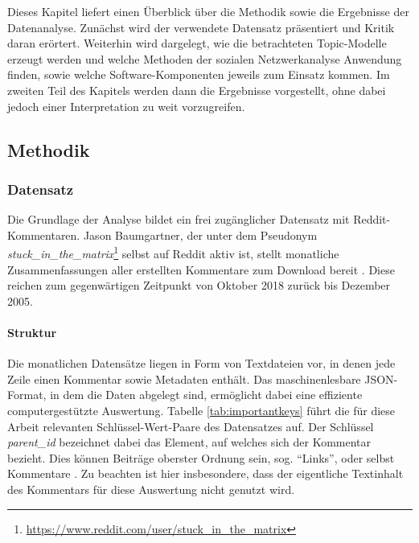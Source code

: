 \documentclass[11pt,a4paper,twoside]{article}
\let\rmarkdownfootnote\footnote%
\def\footnote{\protect\rmarkdownfootnote}
\let\oldpar\paragraph
\renewcommand{\paragraph}{\oldpar*}
\begin{document}
Dieses Kapitel liefert einen Überblick über die Methodik sowie die
Ergebnisse der Datenanalyse. Zunächst wird der verwendete Datensatz
präsentiert und Kritik daran erörtert. Weiterhin wird dargelegt, wie die
betrachteten Topic-Modelle erzeugt werden und welche Methoden der
sozialen Netzwerkanalyse Anwendung finden, sowie welche
Software-Komponenten jeweils zum Einsatz kommen. Im zweiten Teil des
Kapitels werden dann die Ergebnisse vorgestellt, ohne dabei jedoch einer
Interpretation zu weit vorzugreifen.

\hypertarget{methodik}{%
\subsection{Methodik}\label{methodik}}

\hypertarget{datensatz}{%
\subsubsection{Datensatz}\label{datensatz}}

Die Grundlage der Analyse bildet ein frei zugänglicher Datensatz mit
Reddit-Kommentaren. Jason Baumgartner, der unter dem Pseudonym
\emph{stuck\_in\_the\_matrix}\footnote{\url{https://www.reddit.com/user/stuck_in_the_matrix}}
selbst auf Reddit aktiv ist, stellt monatliche Zusammenfassungen aller
erstellten Kommentare zum Download bereit \autocite{Baumgartner}. Diese
reichen zum gegenwärtigen Zeitpunkt von Oktober 2018 zurück bis Dezember
2005.

\hypertarget{struktur}{%
\paragraph{Struktur}\label{struktur}}

Die monatlichen Datensätze liegen in Form von Textdateien vor, in denen
jede Zeile einen Kommentar sowie Metadaten enthält. Das maschinenlesbare
JSON-Format, in dem die Daten abgelegt sind, ermöglicht dabei eine
effiziente computergestützte Auswertung. Tabelle \ref{tab:importantkeys}
führt die für diese Arbeit relevanten Schlüssel-Wert-Paare des
Datensatzes auf. Der Schlüssel \emph{parent\_id} bezeichnet dabei das
Element, auf welches sich der Kommentar bezieht. Dies können Beiträge
oberster Ordnung sein, sog. \enquote{Links}, oder selbst Kommentare
\autocite{Reddit2018}. Zu beachten ist hier insbesondere, dass der
eigentliche Textinhalt des Kommentars für diese Auswertung nicht genutzt
wird.
\end{document}
